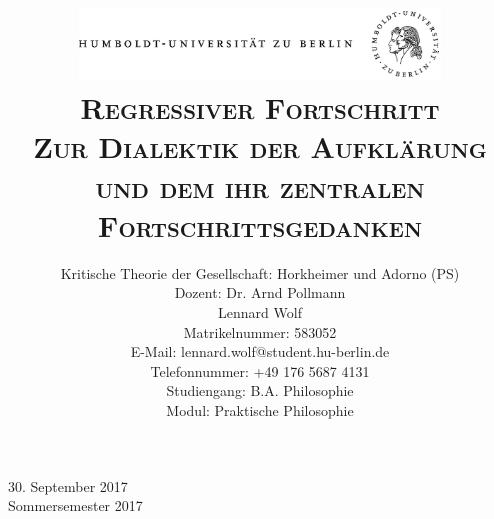 \documentclass[a4paper, 12pt]{article}
\date{\vspace{-3ex}}
\begin{document}
\title{\vspace{5ex}
	\includegraphics*[bb=0 0 720 200, width=0.72\textwidth]{ErstesSem/images/hu_logo.png}\\
	\vspace{30pt}
	\scshape\LARGE{Regressiver Fortschritt}\\\Large{Zur Dialektik der Aufklärung und dem ihr zentralen Fortschrittsgedanken}\\\vspace{20pt}}
	


\author{Kritische Theorie der Gesellschaft: Horkheimer und Adorno (PS)\\
	\vspace{7pt}
          Dozent: Dr. Arnd Pollmann\\\vspace{4pt}Lennard Wolf\\
        \small{Matrikelnummer: 583052}\\
        \small{E-Mail: lennard.wolf@student.hu-berlin.de}\\
        \small{Telefonnummer: +49 176 5687 4131}\\
        \small{Studiengang: B.A. Philosophie}\\
        \small{Modul: Praktische Philosophie}}


\maketitle

\vspace{\fill}

\begin{minipage}[]{0.92\textwidth}
    \centering
    \onehalfspacing
    \large   
    30. September 2017\\
    Sommersemester 2017

    \vspace{-20mm} 
\end{minipage}%
\thispagestyle{empty}
\newpage
\setcounter{page}{1}
\end{document}
